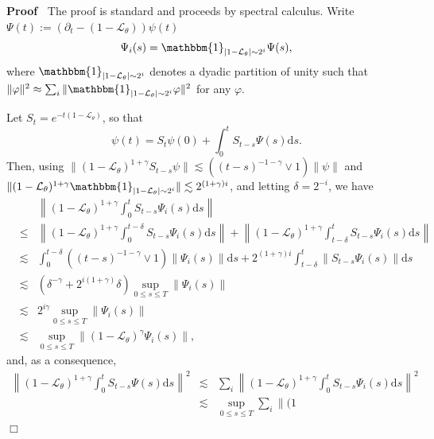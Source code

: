 \documentclass[10pt]{article}
\newcommand{\assign}{:=}
\newcommand{\mathd}{\mathrm{d}}
\newenvironment{proof}{\noindent\textbf{Proof\ }}{\hspace*{\fill}$\Box$\medskip}
\begin{document}
\begin{proof}
  The proof is standard and proceeds by spectral calculus. Write $\Psi (t)
  \assign (\partial_t - (1 -\mathcal{L}_{\theta})) \psi (t)$
  \[ \Psi_i (s) = \mathbbm{1}_{| 1 -\mathcal{L}_{\theta} | \sim 2^i} \Psi (s),
  \]
  where $\mathbbm{1}_{| 1 -\mathcal{L}_{\theta} | \sim 2^i}$ denotes a dyadic
  partition of unity such that $\| \varphi \|^2 \approx \sum_i \|
  \mathbbm{1}_{| 1 -\mathcal{L}_{\theta} | \sim 2^i} \varphi \|^2$ for any
  $\varphi$.
  
  Let $S_t = e^{- t (1 -\mathcal{L}_{\theta})}$, so that
  \[ \psi (t) = S_t \psi (0) + \int_0^t S_{t - s} \Psi (s) \mathd s. \]
  Then, using $\| (1 -\mathcal{L}_{\theta})^{1 + \gamma} S_{t - s} \psi \|
  \lesssim ((t - s)^{- 1 - \gamma} \vee 1) \| \psi \|$ and $\| (1
  -\mathcal{L}_{\theta})^{1 + \gamma} \mathbbm{1}_{| 1 -\mathcal{L}_{\theta} |
  \sim 2^i} \| \lesssim 2^{(1 + \gamma) i}$, and letting $\delta = 2^{- i}$,
  we have
  \[ \begin{array}{lll}
       &  & \left\| (1 -\mathcal{L}_{\theta})^{1 + \gamma} \int_0^t S_{t - s}
       \Psi_i (s) \mathd s \right\|\\
       & \leqslant & \left\| (1 -\mathcal{L}_{\theta})^{1 + \gamma} \int_0^{t
       - \delta} S_{t - s} \Psi_i (s) \mathd s \right\| + \left\| (1
       -\mathcal{L}_{\theta})^{1 + \gamma} \int_{t - \delta}^t S_{t - s}
       \Psi_i (s) \mathd s \right\|\\
       & \lesssim & \int_0^{t - \delta} ((t - s)^{- 1 - \gamma} \vee 1) \|
       \Psi_i (s) \| \mathd s + 2^{(1 + \gamma) i} \int_{t - \delta}^t \| S_{t
       - s} \Psi_i (s) \| \mathd s\\
       & \lesssim & (\delta^{- \gamma} + 2^{i (1 + \gamma)} \delta) \sup_{0
       \leqslant s \leqslant T} \| \Psi_i (s) \|\\
       & \lesssim & 2^{i \gamma} \sup_{0 \leqslant s \leqslant T} \| \Psi_i
       (s) \|\\
       & \lesssim & \sup_{0 \leqslant s \leqslant T} \| (1
       -\mathcal{L}_{\theta})^{\gamma} \Psi_i (s) \|,
     \end{array} \]
  and, as a consequence,
  \[ \begin{array}{lll}
       \left\| (1 -\mathcal{L}_{\theta})^{1 + \gamma} \int_0^t S_{t - s} \Psi
       (s) \mathd s \right\|^2 & \lesssim & \sum_i \left\| (1
       -\mathcal{L}_{\theta})^{1 + \gamma} \int_0^t S_{t - s} \Psi_i (s)
       \mathd s \right\|^2\\
       & \lesssim & \sup_{0 \leqslant s \leqslant T} \sum_i \| (1

\end{array}\]
\end{proof}
\end{document}
